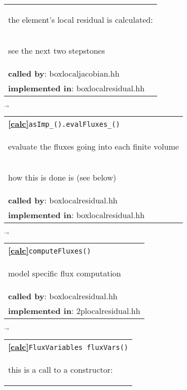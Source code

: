\begin{landscape}
{\begin{tabular}{|l|}
    \begin{scriptsize}the element's local residual is calculated:\end{scriptsize}\\
    \begin{scriptsize}see the next two stepstones\end{scriptsize}\\
      \textbf{called by}: boxlocaljacobian.hh\\
      \textbf{implemented in}: boxlocalresidual.hh\\  
     \hline
  \end{tabular}
    $\overrightarrow{
    }$
    \begin{tabular}{|l|}
      \hline
    \textbf{\textcircled{\ref{calc}}}\verb+asImp_().evalFluxes_()+ \\
    \begin{scriptsize}evaluate the fluxes going into each finite volume\end{scriptsize}\\
    \begin{scriptsize}how this is done is \fbox{\fbox{model specific}} (see below)\end{scriptsize}\\
      \textbf{called by}: boxlocalresidual.hh\\
      \textbf{implemented in}: boxlocalresidual.hh\\  
     \hline
  \end{tabular}
\nextline
{$\overrightarrow{}$}
     \begin{tabular}{||l||}
        \hline\hline
        \textbf{\textcircled{\ref{calc}}}\verb+computeFluxes()+ \\
        \begin{scriptsize}model specific flux computation  \end{scriptsize}\\
        \textbf{called by}: boxlocalresidual.hh\\
        \textbf{implemented in}: 2plocalresidual.hh\\  
        \hline\hline
     \end{tabular}
    $\overrightarrow{
    }$
     \begin{tabular}{||l||}
        \hline\hline
        \textbf{\textcircled{\ref{calc}}}\verb+FluxVariables fluxVars()+ \\
        \begin{scriptsize}this is a call to a constructor:  \end{scriptsize}\\

\end{tabular}}
\end{landscape}
